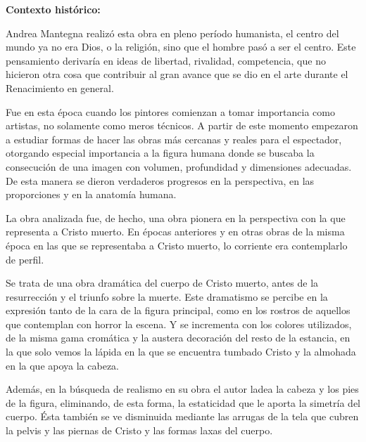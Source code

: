 \textbf{Contexto histórico:}

Andrea Mantegna realizó esta obra en pleno período humanista, el centro del mundo ya no era Dios, o la religión, sino que el hombre pasó a ser el centro. Este pensamiento derivaría en ideas de libertad, rivalidad, competencia, que no hicieron otra cosa que contribuir al gran avance que se dio en el arte durante el Renacimiento en general.

Fue en esta época cuando los pintores comienzan a tomar importancia como artistas, no solamente como meros técnicos. A partir de este momento empezaron a estudiar formas de hacer las obras más cercanas y reales para el espectador, otorgando especial importancia a la figura humana donde se buscaba la consecución de una imagen con volumen, profundidad y dimensiones adecuadas. De esta manera se dieron verdaderos progresos en la perspectiva, en las proporciones y en la anatomía humana.

La obra analizada fue, de hecho, una obra pionera en la perspectiva con la que representa a Cristo muerto. En épocas anteriores y en otras obras de la misma época en las que se representaba a Cristo muerto, lo corriente era contemplarlo de perfil.

Se trata de una obra dramática del cuerpo de Cristo muerto, antes de la resurrección y el triunfo sobre la muerte. Este dramatismo se percibe en la expresión tanto de la cara de la figura principal, como en los rostros de aquellos que contemplan con horror la escena. Y se incrementa con los colores utilizados, de la misma gama cromática y la austera decoración del resto de la estancia, en la que solo vemos la lápida en la que se encuentra tumbado Cristo y la almohada en la que apoya la cabeza.

Además, en la búsqueda de realismo en su obra el autor ladea la cabeza y los pies de la figura, eliminando, de esta forma, la estaticidad que le aporta la simetría del cuerpo. Ésta también se ve disminuida mediante las arrugas de la tela que cubren la pelvis y las piernas de Cristo y las formas laxas del cuerpo.



